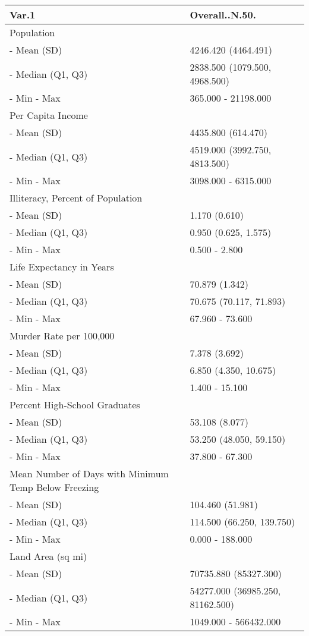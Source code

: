 \documentclass[]{article}
\newenvironment{Shaded}{\begin{snugshade}}{\end{snugshade}}
\newcommand{\DataTypeTok}[1]{\textcolor[rgb]{0.13,0.29,0.53}{#1}}
\newcommand{\KeywordTok}[1]{\textcolor[rgb]{0.13,0.29,0.53}{\textbf{#1}}}
\newcommand{\NormalTok}[1]{#1}
\newcommand{\OperatorTok}[1]{\textcolor[rgb]{0.81,0.36,0.00}{\textbf{#1}}}
\newcommand{\StringTok}[1]{\textcolor[rgb]{0.31,0.60,0.02}{#1}}
\begin{document}
\begin{Shaded}
\end{Shaded}

\begin{longtable}[]{@{}ll@{}}
\toprule
Var.1 & Overall..N.50.\tabularnewline
\midrule
\endhead
Population &\tabularnewline
- Mean (SD) & 4246.420 (4464.491)\tabularnewline
- Median (Q1, Q3) & 2838.500 (1079.500, 4968.500)\tabularnewline
- Min - Max & 365.000 - 21198.000\tabularnewline
Per Capita Income &\tabularnewline
- Mean (SD) & 4435.800 (614.470)\tabularnewline
- Median (Q1, Q3) & 4519.000 (3992.750, 4813.500)\tabularnewline
- Min - Max & 3098.000 - 6315.000\tabularnewline
Illiteracy, Percent of Population &\tabularnewline
- Mean (SD) & 1.170 (0.610)\tabularnewline
- Median (Q1, Q3) & 0.950 (0.625, 1.575)\tabularnewline
- Min - Max & 0.500 - 2.800\tabularnewline
Life Expectancy in Years &\tabularnewline
- Mean (SD) & 70.879 (1.342)\tabularnewline
- Median (Q1, Q3) & 70.675 (70.117, 71.893)\tabularnewline
- Min - Max & 67.960 - 73.600\tabularnewline
Murder Rate per 100,000 &\tabularnewline
- Mean (SD) & 7.378 (3.692)\tabularnewline
- Median (Q1, Q3) & 6.850 (4.350, 10.675)\tabularnewline
- Min - Max & 1.400 - 15.100\tabularnewline
Percent High-School Graduates &\tabularnewline
- Mean (SD) & 53.108 (8.077)\tabularnewline
- Median (Q1, Q3) & 53.250 (48.050, 59.150)\tabularnewline
- Min - Max & 37.800 - 67.300\tabularnewline
Mean Number of Days with Minimum Temp Below Freezing &\tabularnewline
- Mean (SD) & 104.460 (51.981)\tabularnewline
- Median (Q1, Q3) & 114.500 (66.250, 139.750)\tabularnewline
- Min - Max & 0.000 - 188.000\tabularnewline
Land Area (sq mi) &\tabularnewline
- Mean (SD) & 70735.880 (85327.300)\tabularnewline
- Median (Q1, Q3) & 54277.000 (36985.250, 81162.500)\tabularnewline
- Min - Max & 1049.000 - 566432.000\tabularnewline
\bottomrule
\end{longtable}
\end{document}
